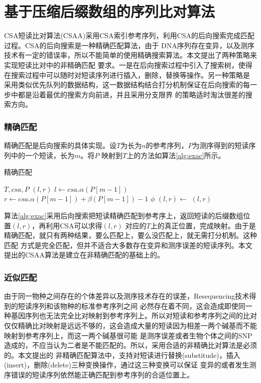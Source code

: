 
\chapter{基于压缩后缀数组的序列比对算法}
CSA短读比对算法(CSAA)采用CSA索引参考序列，利用CSA的后向搜索完成匹配过程。CSA的后向搜索是一种精确匹配算法，由于
DNA序列存在变异，以及测序技术有一定的错误率，所以不能简单的使用精确搜索算法。本文提出了两种策略来实现短读比对中的非精确匹配
要求。一是在后向搜索过程中引入了搜索树，使得在搜索过程中可以随时对短读序列进行插入，删除，替换等操作。另一种策略是
采用类似优先队列的数据结构，这一数据结构结合打分机制保证在后向搜索的每一步中都是沿着最优的搜索方向前进，并且采用分支限界
的策略适时淘汰很差的搜索方向。


\subsection{精确匹配}

精确匹配是后向搜索的具体实现。设$T$为长为$n$的参考序列，$P$为测序得到的短读序列中的一个短读，长为$m$。将$P$
映射到$T$上的方法如算法\ref{alg:exac}所示。

\begin{algorithm}
    \caption{精确匹配}
    \label{alg:exac}
    \begin{algorithmic}[1]
        \Require $T,csa,P$
        \Ensure $(l,r)$
        \State $l \gets csa.\alpha(P[m-1])$
        \State $r \gets csa.\alpha(P[m-1])+\beta(P[m-1])-1$
                \State \Return $\phi$
            \EndIf
            \State $(l,r) \gets$ 
        \EndFor
        \State \Return $(l,r)$
        \EndFunction
    \end{algorithmic}
\end{algorithm}

算法\ref{alg:exac}采用后向搜索把短读精确匹配到参考序上，返回短读的后缀数组位置$(l,r)$，再利用CSA可以求得$(l,r)$
对应的$T$上的真正位置，完成映射。由于是精确匹配，就只有两种结果，要么匹配上，要么没匹配上，就无需打分机制。这种匹配
方式是完全匹配，但并不适合大多数存在变异和测序误差的短读序列。本文提出的CSAA算法是建立在非精确匹配的基础上的。

\subsection{近似匹配}

由于同一物种之间存在的个体差异以及测序技术存在的误差，Resequencing技术得到的短读序列和该物种的标准参考序列之间
必然存在着不同，这会造成即使同一种基因序列也无法完全比对映射到参考序列上。所以对短读和参考序列之间的比对
仅仅精确比对映射是远远不够的，这会造成大量的短读因为相差一两个碱基而不能映射到参考序列上，而这一两个碱基很可能
是测序误差或者生物个体之间的SNP造成的，不应当认为二者是不能匹配的。所以，采用合适的非精确比对算法是必须的。本文提出的
非精确匹配算法中，支持对短读进行替换(substitude)，插入(insert)，删除(delete)三种变换操作，通过这三种变换可以保证
变异的或者发生测序错误的短读序列依然能正确匹配到参考序列的合适位置上。

